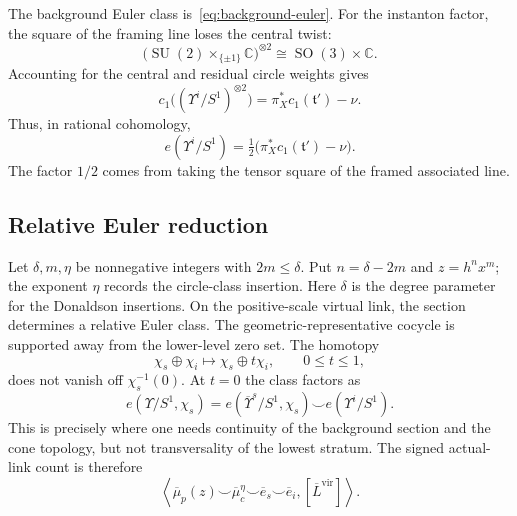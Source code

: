 \documentclass[11pt]{amsart}
\theoremstyle{definition}
\theoremstyle{remark}
\theoremstyle{plain}
\newcommand{\CC}{\mathbb{C}}
\newcommand{\SO}{\operatorname{SO}}
\newcommand{\SU}{\operatorname{SU}}
\begin{document}
The background Euler class is~\eqref{eq:background-euler}.  For the
instanton factor, the square of the framing line loses the central twist:
\[
 \bigl(\SU(2)\times_{\{\pm1\}}\CC\bigr)^{\otimes2}
 \cong\SO(3)\times\CC.
\]
Accounting for the central and residual circle weights gives
\begin{equation}\label{eq:instanton-euler-square}
 c_1\bigl((\Upsilon^i/S^1)^{\otimes2}\bigr)
 =\pi_X^*c_1(\mathfrak t')-\nu.
\end{equation}
Thus, in rational cohomology,
\begin{equation}\label{eq:instanton-euler}
 e(\Upsilon^i/S^1)
 =\tfrac12\bigl(\pi_X^*c_1(\mathfrak t')-\nu\bigr).
\end{equation}
The factor $1/2$ comes from taking the tensor square of the framed
associated line.

\subsection{Relative Euler reduction}
Let $\delta,m,\eta$ be nonnegative integers with $2m\leq\delta$.
Put $n=\delta-2m$ and $z=h^nx^m$; the exponent $\eta$ records the
circle-class insertion.  Here $\delta$ is the degree parameter for the
Donaldson insertions.
On the positive-scale virtual link, the section determines a relative Euler
class.  The geometric-representative cocycle is supported away from the
lower-level zero set.  The homotopy
\begin{equation}\label{eq:euler-homotopy}
\chi_s\oplus\chi_i\longmapsto\chi_s\oplus t\chi_i,
\qquad 0\leq t\leq1,
\end{equation}
does not vanish off $\chi_s^{-1}(0)$.  At $t=0$ the class factors as
\begin{equation}\label{eq:euler-factorization}
 e(\Upsilon/S^1,\chi_s)
 =e(\overline\Upsilon^s/S^1,\chi_s)
  \smile e(\Upsilon^i/S^1).
\end{equation}
This is precisely where one needs continuity of the background section and
the cone topology, but not transversality of the lowest stratum.  The signed
actual-link count is therefore
\begin{equation}\label{eq:relative-pairing}
 \left\langle
 \overline\mu_p(z)\smile\overline\mu_c^{\eta}
 \smile\overline e_s\smile\overline e_i,
 [\overline L^{\mathrm{vir}}]\right\rangle.
\end{equation}
\end{document}
